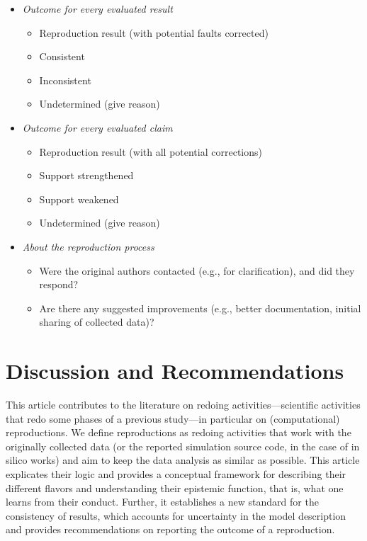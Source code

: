 \documentclass[authordate, meta]{jote-new-article}
\begin{document}
	\begin{fullWide}[]
		\begin{itemize}
			\item \emph{Outcome for every evaluated result}
			\begin{itemize}[leftmargin=2.5em, label={\hspace{1em}\textbullet}]
				\item Reproduction result (with potential faults corrected)
				\item {} Consistent
				\item {} Inconsistent
				\item {} Undetermined (give reason)
			\end{itemize}
			\item \emph{Outcome for every evaluated claim}
			\begin{itemize}[leftmargin=2.5em, label={\hspace{1em}\textbullet}]
				\item Reproduction result (with all potential corrections)
				\item {} Support strengthened
				\item {} Support weakened
				\item {} Undetermined (give reason)
			\end{itemize}
			\item \emph{About the reproduction process}
			\begin{itemize}[leftmargin=2.5em, label={\hspace{1em}\textbullet}]
			\item Were the original authors contacted (e.g., for clarification), and did they respond?
			\item Are there any suggested improvements (e.g., better documentation, initial sharing of collected data)?
			\end{itemize}
		\end{itemize}
	\end{fullWide}

	
	\section{Discussion and Recommendations}

	This article contributes to the literature on redoing activities—scientific activities that redo some phases of a previous study—in particular on (computational) reproductions. We define reproductions as redoing activities that work with the originally collected data (or the reported simulation source code, in the case of in silico works) and aim to keep the data analysis as similar as possible. This article explicates their logic and provides a conceptual framework for describing their different flavors and understanding their epistemic function, that is, what one learns from their conduct. Further, it establishes a new standard for the consistency of results, which accounts for uncertainty in the model description and provides recommendations on reporting the outcome of a reproduction.
\end{document}
